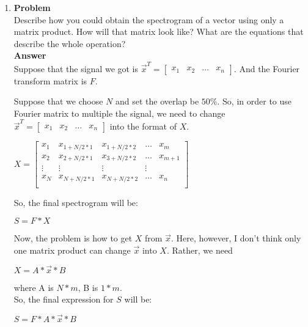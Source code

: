 

\usepackage{graphicx,amssymb,amsmath, listings}
\oddsidemargin 0in
\evensidemargin 0in
\textwidth 6.5in
\topmargin -0.5in
\textheight 9.0in




\pagestyle{myheadings}  %

\begin{enumerate}
\item {\bf Problem}\\

Describe how you could obtain the spectrogram of a vector using only a matrix product. How will that matrix look like? What are the equations that describe the whole operation?\\

{\bf Answer}\\

Suppose that the signal we got is $\vec{x}^T = \begin{bmatrix}
x_1 & x_2 & \ldots & x_n \end{bmatrix}$. And the Fourier transform matrix is $F$.

Suppose that we choose $N$ and set the overlap be $50\%$. So, in order to use Fourier matrix to multiple the signal, we need to change $\vec{x}^T = 
\begin{bmatrix} x_1 & x_2 & \ldots & x_n \end{bmatrix}$ into the format of $X$.\\

\begin{center}
$X = \begin{bmatrix}
x_1 & x_{1+N/2*1} &  x_{1+N/2*2} & \ldots & x_m \\
x_2 & x_{2+N/2*1} &  x_{3+N/2*2} & \ldots & x_{m+1} \\
\vdots & \vdots & \vdots & \vdots \\
x_N & x_{N+N/2*1} &  x_{N+N/2*2} & \ldots & x_n\\
\end{bmatrix}$
\end{center}

So, the final spectrogram will be:
\begin{center}
$S = F*X $
\end{center}

Now, the problem is how to get $X$ from $\vec{x}$. Here, however, I don't think only one matrix product can change $\vec{x}$ into $X$. Rather, we need
\begin{center}
$X = A * \vec{x} *B $
\end{center}
where A is $N*m$, B is $1*m$.\\

So, the final expression for $S$ will be:\\
\begin{center}
$S = F* A * \vec{x} *B $
\end{center}

\end{enumerate}



